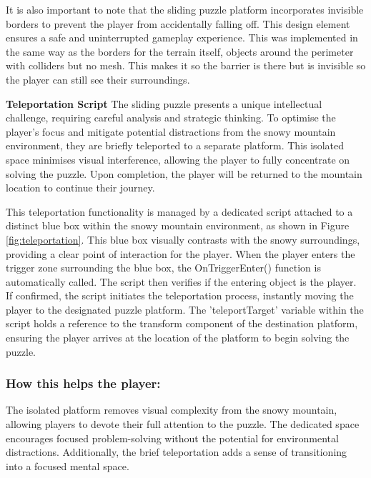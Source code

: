 \documentclass{l4proj}
\begin{document}
It is also important to note that the sliding puzzle platform incorporates invisible borders to prevent the player from accidentally falling off. This design element ensures a safe and uninterrupted gameplay experience. This was implemented in the same way as the borders for the terrain itself, objects around the perimeter with colliders but no mesh. This makes it so the barrier is there but is invisible so the player can still see their surroundings.
\newline

\textbf{Teleportation Script} \newline
The sliding puzzle presents a unique intellectual challenge, requiring careful analysis and strategic thinking. To optimise the player's focus and mitigate potential distractions from the snowy mountain environment, they are briefly teleported to a separate platform. This isolated space minimises visual interference, allowing the player to fully concentrate on solving the puzzle. Upon completion, the player will be returned to the mountain location to continue their journey.

This teleportation functionality is managed by a dedicated script attached to a distinct blue box within the snowy mountain environment, as shown in Figure \ref{fig:teleportation}. This blue box visually contrasts with the snowy surroundings, providing a clear point of interaction for the player. When the player enters the trigger zone surrounding the blue box, the OnTriggerEnter() function is automatically called. The script then verifies if the entering object is the player. If confirmed, the script initiates the teleportation process, instantly moving the player to the designated puzzle platform. The 'teleportTarget' variable within the script holds a reference to the transform component of the destination platform, ensuring the player arrives at the location of the platform to begin solving the puzzle.

\subsubsection{How this helps the player:} The isolated platform removes visual complexity from the snowy mountain, allowing players to devote their full attention to the puzzle. The dedicated space encourages focused problem-solving without the potential for environmental distractions. Additionally,  the brief teleportation adds a sense of transitioning into a focused mental space.
\end{document}
